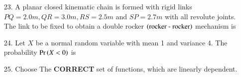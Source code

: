 \documentclass[journal,12pt,onecolumn]{IEEEtran}
\theoremstyle{remark}
\begin{document}
\begin{enumerate}
    \item[23.] A planar closed kinematic chain is formed with rigid links $PQ = 2.0m, QR = 3.0m, RS = 2.5m$ and
        $SP = 2.7m$ with all revolute joints. The link to be fixed to obtain a double rocker $\left(\textnormal{rocker - rocker}\right)$
        mechanism is
        \hfill{}
        \begin{enumerate}
        \end{enumerate}
    \item[24.] Let $X$ be a normal random variable with mean 1 and variance 4. The 
        probability $\Pr\left(X < 0\right)$ is 
        \hfill{}
        \begin{enumerate}
        \end{enumerate}

    \item[25.] Choose The \textbf{CORRECT} set of functions, which are linearly dependent. 
        \hfill{}

        \begin{enumerate}
\end{enumerate}
\end{enumerate}
\end{document}
